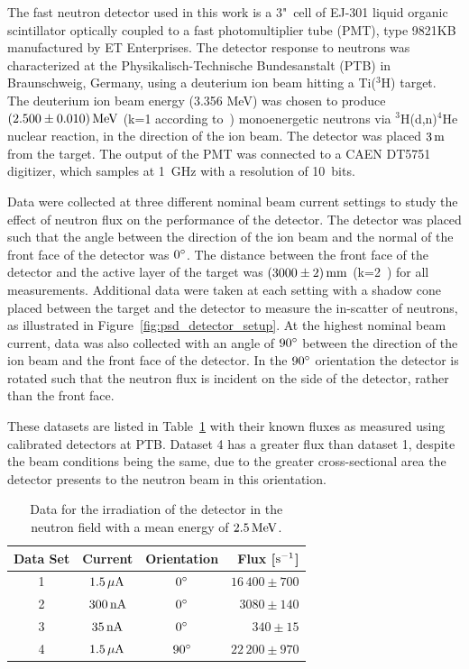 The fast neutron detector used in this work is a 3"~cell of EJ-301 liquid organic scintillator optically coupled to a fast photomultiplier tube (PMT), type 9821KB manufactured by ET Enterprises. The detector response to neutrons was characterized at the Physikalisch-Technische Bundesanstalt (PTB) in Braunschweig, Germany,  using a deuterium ion beam hitting a Ti($^3$H) target. The deuterium ion beam energy (3.356 MeV) was chosen to produce $(2.500\pm 0.010)\,\mathrm{MeV}$ (k=1 according to~\cite{GUM}) monoenergetic neutrons via $^{3}$H(d,n)$^{4}$He nuclear reaction, in the direction of the ion beam. The detector was placed $3\,\mathrm{m}$ from the target. The output of the PMT was connected to a CAEN DT5751 digitizer, which samples at 1~GHz with a resolution of 10~bits.

Data were collected at three different nominal beam current settings to study the effect of neutron flux on the performance of the detector. The detector was placed such that the angle between the direction of the ion beam and the normal of the front face of the detector was $0{}^{\circ}$. The distance between the front face of the detector and the active layer of the target was $(3000\pm 2)\,\mathrm{mm}$ (k=2~\cite{GUM}) for all measurements. Additional data were taken at each setting with a shadow cone placed between the target and the detector to measure the in-scatter of neutrons, as illustrated in Figure~\ref{fig:psd_detector_setup}. At the highest nominal beam current, data was also collected with an angle of $90{}^{\circ}$ between the direction of the ion beam and the front face of the detector. In the $90{}^{\circ}$ orientation the detector is rotated such that the neutron flux is incident on the side of the detector, rather than the front face.

These datasets are listed in Table~\ref{tab:psd_datasets} with their known fluxes as measured using calibrated detectors at PTB. Dataset 4 has a greater flux than dataset 1, despite the beam conditions being the same, due to the greater cross-sectional area the detector presents to the neutron beam in this orientation.

\begin{table}[htb]
    \caption{Data for the irradiation of the detector in the neutron field with a mean energy of $2.5\,\mathrm{MeV}$. }\label{tab:psd_datasets}
\centering
    \begin{tabular}{c c c r }
        \hline
        Data Set & Current & Orientation & \;\; Flux [$\mathrm{s^{-1}}$] \\
        \hline
        1 & $1.5\,\mathrm{\mu A}$ & $0{}^{\circ}$ & \;$16\,400 \pm 700$ \\
        2 & $300\,\mathrm{nA}$ & $0{}^{\circ}$ & \;$3080 \pm 140$\\
        3 & $35\,\mathrm{nA}$ & $0{}^{\circ}$ & \;$340 \pm 15$\\
        4 & $1.5\,\mathrm{\mu A}$ & $90{}^{\circ}$ & \;$22\,200 \pm 970$\\
        \hline
    \end{tabular}
\end{table}

